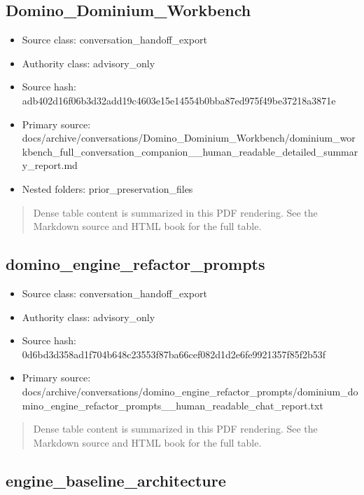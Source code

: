 \documentclass[11pt,a4paper]{report}
\begin{document}
\subsection{Domino\_Dominium\_Workbench}

\begin{itemize}
\item Source class: conversation\_handoff\_export
\item Authority class: advisory\_only
\item Source hash: adb402d16f06b3d32add19c4603e15e14554b0bba87ed975f49be37218a3871e
\item Primary source: docs/archive/conversations/Domino\_Dominium\_Workbench/dominium\_workbench\_full\_conversation\_companion\_\_human\_readable\_detailed\_summary\_report.md
\item Nested folders: prior\_preservation\_files
\end{itemize}

\begin{quote}\small Dense table content is summarized in this PDF rendering. See the Markdown source and HTML book for the full table.\end{quote}

\subsection{domino\_engine\_refactor\_prompts}

\begin{itemize}
\item Source class: conversation\_handoff\_export
\item Authority class: advisory\_only
\item Source hash: 0d6bd3d358ad1f704b648c23553f87ba66cef082d1d2e6fe9921357f85f2b53f
\item Primary source: docs/archive/conversations/domino\_engine\_refactor\_prompts/dominium\_domino\_engine\_refactor\_prompts\_\_human\_readable\_chat\_report.txt
\end{itemize}

\begin{quote}\small Dense table content is summarized in this PDF rendering. See the Markdown source and HTML book for the full table.\end{quote}

\subsection{engine\_baseline\_architecture}
\end{document}
